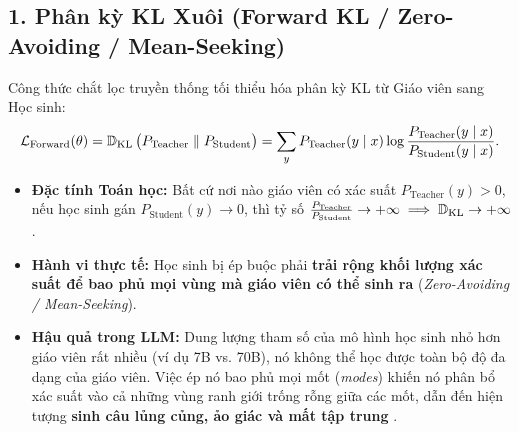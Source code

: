 \subsection{1. Phân kỳ KL Xuôi (Forward KL / Zero-Avoiding / Mean-Seeking)}
Công thức chắt lọc truyền thống tối thiểu hóa phân kỳ KL từ Giáo viên sang Học sinh:
\begin{equation}
    \mathcal{L}_{\text{Forward}}(\theta) = \operatorname{\mathbb{D}_{\mathrm{KL}}}\big(P_{\text{Teacher}} \parallel P_{\text{Student}}\big) = \sum_{y} P_{\text{Teacher}}(y \mid x) \log \frac{P_{\text{Teacher}}(y \mid x)}{P_{\text{Student}}(y \mid x)}.
    \label{eq:forward_kl_kd}
\end{equation}
\begin{itemize}[leftmargin=1.2cm]
    \item \textbf{Đặc tính Toán học:} Bất cứ nơi nào giáo viên có xác suất $P_{\text{Teacher}}(y) > 0$, nếu học sinh gán $P_{\text{Student}}(y) \to 0$, thì tỷ số $\frac{P_{\text{Teacher}}}{P_{\text{Student}}} \to +\infty \implies \operatorname{\mathbb{D}_{\mathrm{KL}}} \to +\infty$.
    \item \textbf{Hành vi thực tế:} Học sinh bị ép buộc phải \textbf{trải rộng khối lượng xác suất để bao phủ mọi vùng mà giáo viên có thể sinh ra} (\textit{Zero-Avoiding / Mean-Seeking}).
    \item \textbf{Hậu quả trong LLM:} Dung lượng tham số của mô hình học sinh nhỏ hơn giáo viên rất nhiều (ví dụ 7B vs. 70B), nó không thể học được toàn bộ độ đa dạng của giáo viên. Việc ép nó bao phủ mọi mốt (\textit{modes}) khiến nó phân bổ xác suất vào cả những vùng ranh giới trống rỗng giữa các mốt, dẫn đến hiện tượng \textbf{sinh câu lủng củng, ảo giác và mất tập trung} \citep{gu2024minillm}.
\end{itemize}


